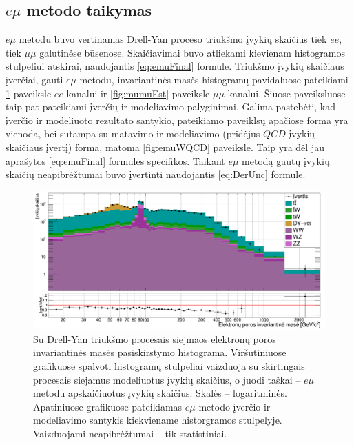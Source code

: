 \documentclass[a4paper, 12pt]{article}
\newcommand{\emu}{e\mu}
\newcommand{\mumu}{\mu\mu}
\newcommand{\QCD}{QC\! D}
\newlength\q
\begin{document}
\subsection{$\emu$ metodo taikymas}

$\emu$ metodu buvo vertinamas Drell-Yan proceso triukšmo įvykių skaičius tiek $ee$, tiek $\mumu$ galutinėse būsenose.
Skaičiavimai buvo atliekami kievienam histogramos stulpeliui atskirai, naudojantis \eqref{eq:emuFinal} formule.
Triukšmo įvykių skaičiaus įverčiai, gauti $\emu$ metodu, invariantinės masės histogramų pavidaluose pateikiami
\ref{fig:eeEst} paveiksle $ee$ kanalui ir \ref{fig:mumuEst} paveiksle $\mumu$ kanalui.
Šiuose paveiksluose taip pat pateikiami įverčių ir modeliavimo palyginimai.
Galima pastebėti, kad įverčio ir modeliuoto rezultato santykio, pateikiamo paveiklsų apačiose forma yra vienoda, bei
sutampa su matavimo ir modeliavimo (pridėjus $\QCD$ įvykių skaičiaus įvertį) forma, matoma \ref{fig:emuWQCD} paveiksle.
Taip yra dėl jau aprašytos \eqref{eq:emuFinal} formulės specifikos.
Taikant $\emu$ metodą gautų įvykių skaičių neapibrėžtumai buvo įvertinti naudojantis \ref{eq:DerUnc} formule.

\begin{figure}
	\includegraphics[width=\linewidth]{eeMassEst_BIG.png}
	\caption{\label{fig:eeEst} \small
		Su Drell-Yan triukšmo procesais siejmaos elektronų poros invariantinės masės pasiskirstymo histograma.
		Viršutiniuose grafikuose spalvoti histogramų stulpeliai vaizduoja su skirtingais procesais siejamus modeliuotus įvykių
		skaičius, o juodi taškai -- $\emu$ metodu apskaičiuotus įvykių skaičius.
		Skalės -- logaritminės.
		Apatiniuose grafikuose pateikiamas $\emu$ metodo įverčio ir modeliavimo santykis kiekviename historgramos stulpelyje.
		Vaizduojami neapibrėžtumai -- tik statistiniai.
	}
\end{figure}
\end{document}
